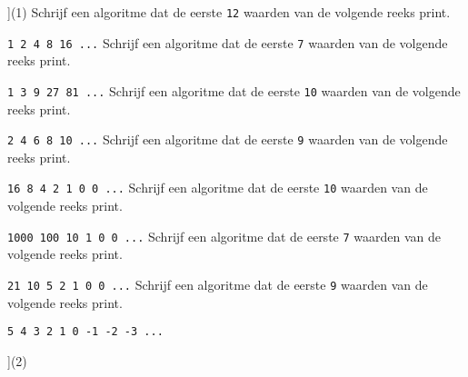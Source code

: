 \begin{exercise}
    \begin{longtasks}[counter-format=7.tsk[1]](1)
        \task
        Schrijf een algoritme dat de eerste \texttt{12} waarden van de volgende reeks print.

        \texttt{1 2 4 8 16 ...}
        \task
        Schrijf een algoritme dat de eerste \texttt{7} waarden van de volgende reeks print.

        \texttt{1 3 9 27 81 ...}
        \task
        Schrijf een algoritme dat de eerste \texttt{10} waarden van de volgende reeks print.

        \texttt{2 4 6 8 10 ...}
        \task
        Schrijf een algoritme dat de eerste \texttt{9} waarden van de volgende reeks print.

        \texttt{16 8 4 2 1 0 0 ...}
        \task
        Schrijf een algoritme dat de eerste \texttt{10} waarden van de volgende reeks print.

        \texttt{1000 100 10 1 0 0 ...}
        \task
        Schrijf een algoritme dat de eerste \texttt{7} waarden van de volgende reeks print.

        \texttt{21 10 5 2 1 0 0 ...}
        \task
        Schrijf een algoritme dat de eerste \texttt{9} waarden van de volgende reeks print.

        \texttt{5 4 3 2 1 0 -1 -2 -3 ...}
    \end{longtasks}
\end{exercise}

\begin{solution}
    \begin{mltasks}[counter-format=7.tsk[1]](2)
        \task {}
        \task {}
        \task {}
        \task {}
        \task {}
        \task {}
    \end{mltasks}
\end{solution}
